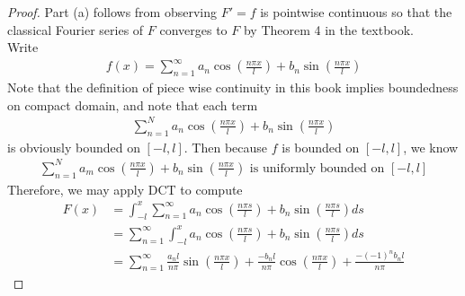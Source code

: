 \documentclass{report}
\begin{document}
\begin{proof}
Part (a) follows from observing $F'=f$ is pointwise continuous so that the classical Fourier series of $F$ converges to  $F$ by Theorem 4 in the textbook.\\

Write 
\begin{align*}
f(x)=\sum_{n=1}^{\infty} a_n\cos ( \frac{n \pi  x}{l})+ b_n \sin ( \frac{n \pi  x}{l}) 
\end{align*}
Note that the definition of piece wise continuity in this book implies boundedness on compact domain, and note that each term
\begin{align*}
\sum_{n=1}^N a_n \cos (\frac{n \pi  x}{l})+ b_n \sin (\frac{n \pi  x}{l})
\end{align*}
is obviously bounded on $[-l,l]$. Then because $f$ is bounded on $[-l,l]$, we know 
\begin{align*}
\sum_{n=1}^N a_m \cos (\frac{n \pi  x}{l})+ b_n \sin (\frac{n \pi  x}{l})\text{ is uniformly bounded on }[-l,l]
\end{align*}
Therefore, we may apply DCT to compute 
\begin{align*}
F(x)&= \int_{-l}^x \sum_{n=1}^{\infty} a_n \cos ( \frac{n \pi  s}{l})+ b_n \sin ( \frac{n \pi  s}{l})ds  \\
&=\sum_{n=1}^{\infty} \int_{-l}^x a_n \cos ( \frac{n \pi  s}{l})+ b_n \sin ( \frac{n \pi  s}{l})ds\\
&=\sum_{n=1}^{\infty} \frac{a_n l}{n \pi  }\sin ( \frac{ n \pi  x}{l}) + \frac{-b_n l}{n \pi }\cos (\frac{n \pi  x}{l})+ \frac{-(-1)^nb_nl}{n \pi }
\end{align*}
\end{proof}
\end{document}
